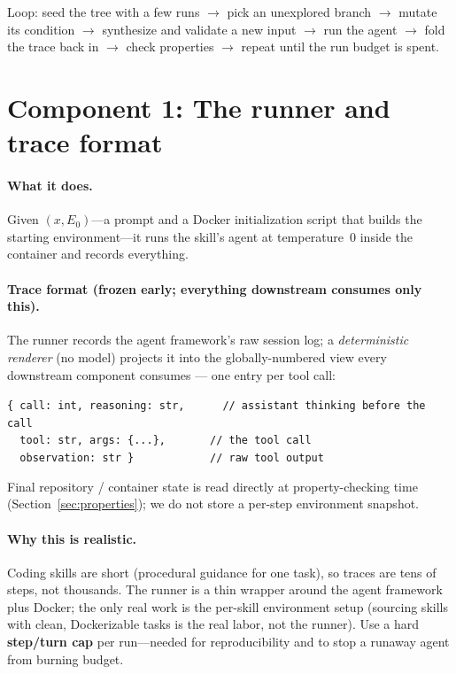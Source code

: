 \documentclass[11pt]{article}
\begin{document}
Loop: seed the tree with a few runs $\to$ pick an unexplored branch $\to$
mutate its condition $\to$ synthesize and validate a new input $\to$ run the
agent $\to$ fold the trace back in $\to$ check properties $\to$ repeat until the
run budget is spent.

\section{Component 1: The runner and trace format}

\paragraph{What it does.} Given $(x, E_0)$---a prompt and a Docker
initialization script that builds the starting environment---it runs the skill's
agent at temperature~0 inside the container and records everything.

\paragraph{Trace format (frozen early; everything downstream consumes only
this).} The runner records the agent framework's raw session log; a
\emph{deterministic renderer} (no model) projects it into the globally-numbered
view every downstream component consumes --- one entry per tool call:
\begin{tcolorbox}[colback=gray!5,boxrule=0.4pt]
\small
\texttt{\{ call: int, reasoning: str,\ \ \ \ \ \ // assistant thinking before the call}\\
\texttt{\ \ tool: str, args: \{...\},\ \ \ \ \ \ \ // the tool call}\\
\texttt{\ \ observation: str \}\ \ \ \ \ \ \ \ \ \ \ \ // raw tool output}
\end{tcolorbox}

\noindent Final repository / container state is read directly at
property-checking time (Section~\ref{sec:properties}); we do not store a
per-step environment snapshot.

\paragraph{Why this is realistic.} Coding skills are short (procedural guidance
for one task), so traces are tens of steps, not thousands. The runner is a thin
wrapper around the agent framework plus Docker; the only real work is the
per-skill environment setup (sourcing skills with clean, Dockerizable tasks is
the real labor, not the runner). Use a hard
\textbf{step/turn cap} per run---needed for reproducibility and to stop a runaway
agent from burning budget.
\end{document}
